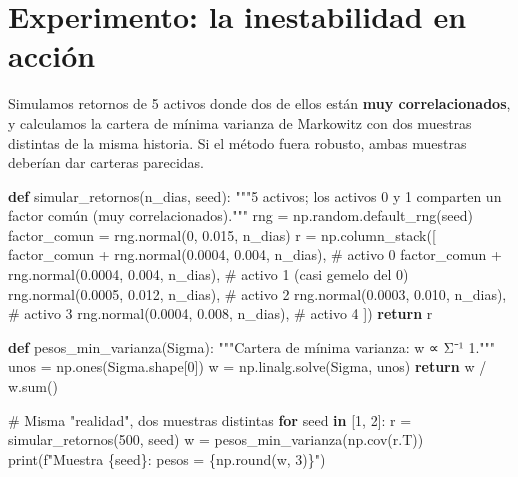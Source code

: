 \documentclass[
  spanish,
  letterpaper,
  DIV=11,
  numbers=noendperiod]{scrreprt}
\newenvironment{Shaded}{\begin{snugshade}}{\end{snugshade}}
\newcommand{\BuiltInTok}[1]{\textcolor[rgb]{0.00,0.23,0.31}{#1}}
\newcommand{\CommentTok}[1]{\textcolor[rgb]{0.37,0.37,0.37}{#1}}
\newcommand{\ControlFlowTok}[1]{\textcolor[rgb]{0.00,0.23,0.31}{\textbf{#1}}}
\newcommand{\DecValTok}[1]{\textcolor[rgb]{0.68,0.00,0.00}{#1}}
\newcommand{\FloatTok}[1]{\textcolor[rgb]{0.68,0.00,0.00}{#1}}
\newcommand{\KeywordTok}[1]{\textcolor[rgb]{0.00,0.23,0.31}{\textbf{#1}}}
\newcommand{\NormalTok}[1]{\textcolor[rgb]{0.00,0.23,0.31}{#1}}
\newcommand{\OperatorTok}[1]{\textcolor[rgb]{0.37,0.37,0.37}{#1}}
\newcommand{\SpecialCharTok}[1]{\textcolor[rgb]{0.37,0.37,0.37}{#1}}
\newcommand{\SpecialStringTok}[1]{\textcolor[rgb]{0.13,0.47,0.30}{#1}}
\begin{document}
\section{Experimento: la inestabilidad en
acción}\label{experimento-la-inestabilidad-en-acciuxf3n}

Simulamos retornos de 5 activos donde dos de ellos están \textbf{muy
correlacionados}, y calculamos la cartera de mínima varianza de
Markowitz con dos muestras distintas de la misma historia. Si el método
fuera robusto, ambas muestras deberían dar carteras parecidas.

\label{inestabilidad}
\begin{Shaded}
\begin{Highlighting}[]
\KeywordTok{def}\NormalTok{ simular\_retornos(n\_dias, seed):}
    \CommentTok{"""5 activos; los activos 0 y 1 comparten un factor común (muy correlacionados)."""}
\NormalTok{    rng }\OperatorTok{=}\NormalTok{ np.random.default\_rng(seed)}
\NormalTok{    factor\_comun }\OperatorTok{=}\NormalTok{ rng.normal(}\DecValTok{0}\NormalTok{, }\FloatTok{0.015}\NormalTok{, n\_dias)}
\NormalTok{    r }\OperatorTok{=}\NormalTok{ np.column\_stack([}
\NormalTok{        factor\_comun }\OperatorTok{+}\NormalTok{ rng.normal(}\FloatTok{0.0004}\NormalTok{, }\FloatTok{0.004}\NormalTok{, n\_dias),   }\CommentTok{\# activo 0}
\NormalTok{        factor\_comun }\OperatorTok{+}\NormalTok{ rng.normal(}\FloatTok{0.0004}\NormalTok{, }\FloatTok{0.004}\NormalTok{, n\_dias),   }\CommentTok{\# activo 1 (casi gemelo del 0)}
\NormalTok{        rng.normal(}\FloatTok{0.0005}\NormalTok{, }\FloatTok{0.012}\NormalTok{, n\_dias),                  }\CommentTok{\# activo 2}
\NormalTok{        rng.normal(}\FloatTok{0.0003}\NormalTok{, }\FloatTok{0.010}\NormalTok{, n\_dias),                  }\CommentTok{\# activo 3}
\NormalTok{        rng.normal(}\FloatTok{0.0004}\NormalTok{, }\FloatTok{0.008}\NormalTok{, n\_dias),                  }\CommentTok{\# activo 4}
\NormalTok{    ])}
    \ControlFlowTok{return}\NormalTok{ r}

\KeywordTok{def}\NormalTok{ pesos\_min\_varianza(Sigma):}
    \CommentTok{"""Cartera de mínima varianza: w ∝ Σ⁻¹ 1."""}
\NormalTok{    unos }\OperatorTok{=}\NormalTok{ np.ones(Sigma.shape[}\DecValTok{0}\NormalTok{])}
\NormalTok{    w }\OperatorTok{=}\NormalTok{ np.linalg.solve(Sigma, unos)}
    \ControlFlowTok{return}\NormalTok{ w }\OperatorTok{/}\NormalTok{ w.}\BuiltInTok{sum}\NormalTok{()}

\CommentTok{\# Misma "realidad", dos muestras distintas}
\ControlFlowTok{for}\NormalTok{ seed }\KeywordTok{in}\NormalTok{ [}\DecValTok{1}\NormalTok{, }\DecValTok{2}\NormalTok{]:}
\NormalTok{    r }\OperatorTok{=}\NormalTok{ simular\_retornos(}\DecValTok{500}\NormalTok{, seed)}
\NormalTok{    w }\OperatorTok{=}\NormalTok{ pesos\_min\_varianza(np.cov(r.T))}
    \BuiltInTok{print}\NormalTok{(}\SpecialStringTok{f"Muestra }\SpecialCharTok{\{}\NormalTok{seed}\SpecialCharTok{\}}\SpecialStringTok{: pesos = }\SpecialCharTok{\{}\NormalTok{np}\SpecialCharTok{.}\BuiltInTok{round}\NormalTok{(w, }\DecValTok{3}\NormalTok{)}\SpecialCharTok{\}}\SpecialStringTok{"}\NormalTok{)}
\end{Highlighting}
\end{Shaded}
\end{document}
